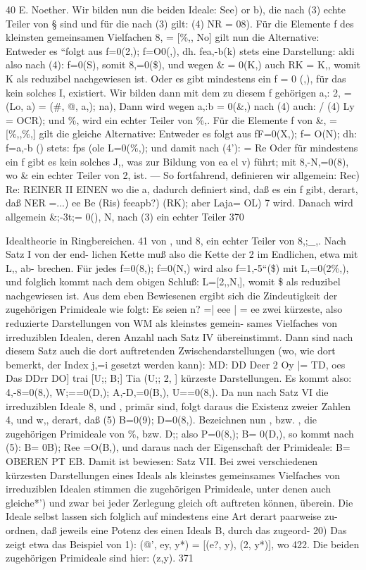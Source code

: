 \documentclass[11pt,a4paper]{article}
\theoremstyle{plain}
\theoremstyle{definition}
\begin{document}
40 
E. Noether. 
Wir bilden nun die beiden Ideale: 
See) 
or b), 
die nach (3) echte Teiler von \S{} sind und für die nach (3) gilt: 
(4) 
NR 
= 08). 
Für die Elemente f des kleinsten gemeinsamen Vielfachen 8, = [\%,, No] 
gilt nun die Alternative: 
Entweder es ``folgt aus 
f=0(2,); 
f=O0(,), 
dh. fea,-b(k) 
stets eine Darstellung: aldi 
also nach (4): f=0(S), somit 8,=0(\$), und wegen \& = 0(K,) auch 
RK = K,, womit K als reduzibel nachgewiesen ist. 
Oder es gibt mindestens ein f = 0 (,), für das kein solches I, existiert. 
Wir bilden dann mit dem zu diesem f gehörigen a,: 
2, = (Lo, a) = (\#, @, a,); 
na), 
Dann wird wegen a,:b = 0(\&,) nach (4) auch: 
/ 
(4) 
Ly 
= OCR); 
und \%, wird ein echter Teiler von \%,. 
Für die Elemente f von \&, = [\%,,\%,] gilt die gleiche Alternative: 
Entweder es folgt aus 
fF=0(X,); 
f= O(N); 
dh: f=a,-b () stets: 
fps (ole 
L=0(\%,); 
und damit nach (4'): 
= Re 
Oder für mindestens ein f gibt es kein solches J,, was zur Bildung 
von 
ea 
el v\textdegree{}) führt; mit 8,-N,=0(8), 
wo \& ein 
echter Teiler von 2, ist. --- So fortfahrend, definieren wir allgemein: 
Rec) 
Re: 
REINER II EINEN 
wo die a, dadurch definiert sind, daß es ein f gibt, derart, daß 
NER 
=...) 
ee 
Be 
(Ris) 
feeapb?) (RK); 
aber 
Laja= OL) 
7 
wird. 
Danach wird allgemein \&;-3t;= 0(), N, nach (3) ein echter Teiler 
370

Idealtheorie in Ringbereichen. 
41 
von , und 8, ein echter Teiler von 8,;\_,. 
Nach Satz I von der end- 
lichen Kette muß also die Kette der 2 im Endlichen, 
etwa mit L,, ab- 
brechen. 
Für jedes f=0(8,); f=0(N,) wird also f=1,-5\textdegree{}``(\$) mit 
L,=0(2\%,), und folglich kommt nach dem obigen Schluß: 
L=[2,,N,], 
womit \$ als reduzibel nachgewiesen ist. 
Aus dem eben Bewiesenen ergibt sich die Zindeutigkeit der zugehörigen 
Primideale wie folgt: 
Es seien 
n? 
=| eee 
| = 
ee 
zwei kürzeste, also reduzierte Darstellungen von WM als kleinstes gemein- 
sames Vielfaches 
von 
irreduziblen 
Idealen, 
deren Anzahl 
nach 
Satz IV 
übereinstimmt. 
Dann sind nach diesem Satz auch die dort auftretenden 
Zwischendarstellungen 
(wo, wie dort bemerkt, 
der Index j,=i gesetzt 
werden kann): 
MD: 
DD Deer 
2 
Oy |= TD, oes Das DDrr 
DO] 
trai [U;; B;] Tia (U;; 2, ] 
kürzeste Darstellungen. 
Es kommt also: 
4,-8=0(8,), 
W;==0(D,); 
A,-D,=0(B,), 
U==0(8,). 
Da nun 
nach Satz VI die irreduziblen Ideale 8, und , primär sind, 
folgt daraus die Existenz zweier Zahlen 4, und w,, derart, daß 
(5) 
B=0(9); 
D=0(8,). 
Bezeichnen nun , bzw. , die zugehörigen Primideale von \%, bzw. D;; 
also P=0(8,); B= 0(D,), so kommt nach (5): 
B= 0B); 
Ree =O(B,), 
und daraus nach der Eigenschaft der Primideale: 
B= OBEREN PT 
EB. 
Damit ist bewiesen: 
Satz VII. 
Bei zwei verschiedenen 
kürzesten Darstellungen 
eines 
Ideals 
als kleinstes gemeinsames 
Vielfaches 
von 
irreduziblen Idealen 
stimmen 
die zugehörigen Primideale, 
unter denen auch gleiche*') und 
zwar bei jeder Zerlegung gleich oft auftreten können, überein. 
Die Ideale 
selbst lassen sich folglich auf mindestens eine Art derart paarweise zu- 
ordnen, daß jeweils eine Potenz des einen Ideals B, durch das zugeord- 
20) Das zeigt etwa das Beispiel von 1\textdegree{}): 
(@', ey, y*) = [(e?, y), (2, y*)], 
wo 422. 
Die beiden zugehörigen Primideale sind hier: (z,y). 
371
\end{document}
